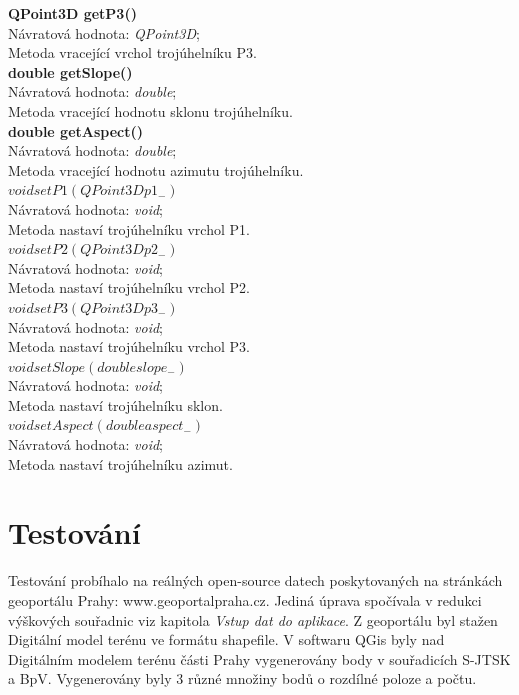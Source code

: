 \documentclass[a4paper, 12pt]{article}
\begin{document}
\textbf{QPoint3D getP3()}\\
Návratová hodnota: \textit{QPoint3D};\\
Metoda vracející vrchol trojúhelníku P3. 
\\

\textbf{double getSlope()}\\
Návratová hodnota: \textit{double};\\
Metoda vracející hodnotu sklonu trojúhelníku. 
\\

\textbf{double getAspect()}\\
Návratová hodnota: \textit{double};\\
Metoda vracející hodnotu azimutu trojúhelníku. 
\\

\textbf{$void setP1(QPoint3D p1_-)$}\\
Návratová hodnota: \textit{void};\\
Metoda nastaví trojúhelníku vrchol P1. 
\\

\textbf{$void setP2(QPoint3D p2_-)$}\\
Návratová hodnota: \textit{void};\\
Metoda nastaví trojúhelníku vrchol P2. 
\\

\textbf{$void setP3(QPoint3D p3_-)$}\\
Návratová hodnota: \textit{void};\\
Metoda nastaví trojúhelníku vrchol P3. 
\\

\textbf{$void setSlope(double slope_-)$}\\
Návratová hodnota: \textit{void};\\
Metoda nastaví trojúhelníku sklon. 
\\

\textbf{$void setAspect(double aspect_-)$}\\
Návratová hodnota: \textit{void};\\
Metoda nastaví trojúhelníku azimut. 
\\

\newpage

\section{Testování}
Testování probíhalo na reálných open-source datech poskytovaných na stránkách geoportálu Prahy: www.geoportalpraha.cz. Jediná úprava spočívala v redukci výškových souřadnic viz kapitola \textit{Vstup dat do aplikace}. Z geoportálu byl stažen Digitální model terénu ve formátu shapefile. V softwaru QGis byly nad Digitálním modelem terénu části Prahy vygenerovány body v souřadicích S-JTSK a BpV. Vygenerovány byly 3 různé množiny bodů o rozdílné poloze a počtu.
\end{document}
